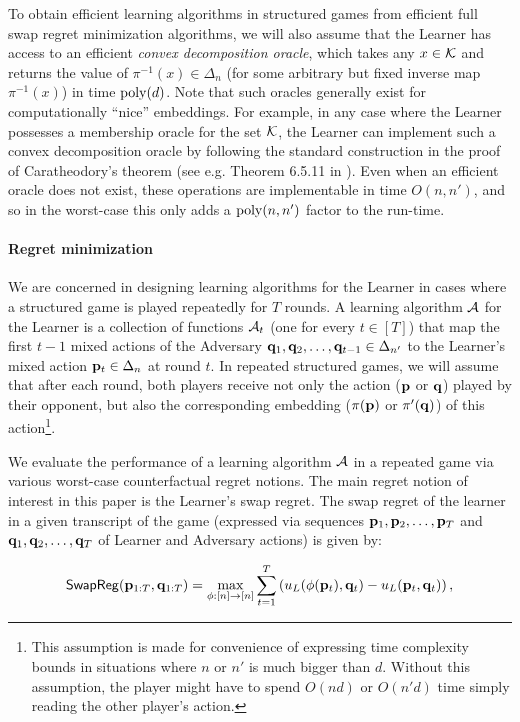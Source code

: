 \documentclass[final,12pt]{alt2025}
\begin{document}
To obtain efficient learning algorithms in structured games from efficient full swap regret minimization algorithms, we will also assume that the Learner has access to an efficient \emph{convex decomposition oracle}, which takes any $x \in \mathcal{K}$ and returns the value of $\pi^{-1}(x) \in \Delta_n$ (for some arbitrary but fixed inverse map $\pi^{-1}(x)$) in time $\operatorname{poly}(d)$. Note that such oracles generally exist for computationally ``nice'' embeddings. For example, in any case where the Learner possesses a membership oracle for the set $\mathcal{K}$, the Learner can implement such a convex decomposition oracle by following the standard construction in the proof of Caratheodory's theorem (see e.g. Theorem 6.5.11 in \cite{grotschel2012geometric}). Even when an efficient  oracle does not exist, these operations are implementable in time $O(n, n')$, and so in the worst-case this only adds a $\operatorname{poly}(n, n')$ factor to the run-time.

\paragraph{Regret minimization}
We are concerned in designing learning algorithms for the Learner in cases where a structured game is played repeatedly for $T$ rounds. A learning algorithm $\mathcal{A}$ for the Learner is a collection of functions $\mathcal{A}_t$ (one for every $t \in [T]$) that map the first $t-1$ mixed actions of the Adversary $\mathbf{q}_1, \mathbf{q}_2, \dots, \mathbf{q}_{t-1} \in \Delta_{n'}$ to the Learner's mixed action $\mathbf{p}_{t} \in \Delta_{n}$ at round $t$. In repeated structured games, we will assume that after each round, both players receive not only the action ($\mathbf{p}$ or $\mathbf{q}$) played by their opponent, but also the corresponding embedding ($\pi(\mathbf{p})$ or $\pi'(\mathbf{q})$) of this action\footnote{This assumption is made for convenience of expressing time complexity bounds in situations where $n$ or $n'$ is much bigger than $d$. Without this assumption, the player might have to spend $O(nd)$ or $O(n'd)$ time simply reading the other player's action.}.

We evaluate the performance of a learning algorithm $\mathcal{A}$ in a repeated game via various worst-case counterfactual regret notions. The main regret notion of interest in this paper is the Learner's swap regret. The swap regret of the learner in a given transcript of the game (expressed via sequences $\mathbf{p}_1, \mathbf{p}_2, \dots, \mathbf{p}_{T}$ and $\mathbf{q}_1, \mathbf{q}_2, \dots, \mathbf{q}_T$ of Learner and Adversary actions) is given by:

$$\operatorname{\mathsf{SwapReg}}(\mathbf{p}_{1:T}, \mathbf{q}_{1:T}) = \max_{\phi: [n] \rightarrow [n]} \sum_{t=1}^{T}\left(u_L(\phi(\mathbf{p}_t), \mathbf{q}_t) - u_L(\mathbf{p}_t, \mathbf{q}_t)\right),$$
\end{document}
